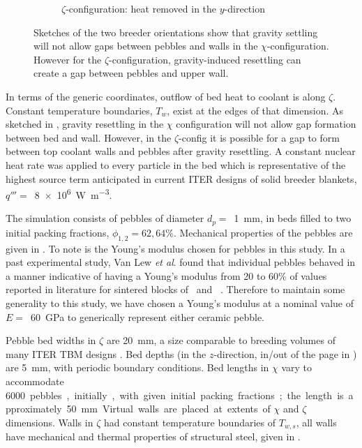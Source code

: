 \begin{figure}[!ht]
\begin{subfigure}[b]{0.44\textwidth}
        \caption{$\zeta$-configuration: heat removed in the $y$-direction}\label{fig:y-domain}
    \end{subfigure}
    \caption{Sketches of the two breeder orientations show that gravity settling will not allow gaps between pebbles and walls in the $\chi$-configuration. However for the $\zeta$-configuration, gravity-induced resettling can create a gap between pebbles and upper wall. }\label{fig:domains}
\end{figure}

In terms of the generic coordinates, outflow of bed heat to coolant is along $\zeta$. Constant temperature boundaries, $T_w$, exist at the edges of that dimension. As sketched in , gravity resettling in the $\chi$ configuration will not allow gap formation between bed and wall. However, in the $\zeta$-config it is possible for a gap to form between top coolant walls and pebbles after gravity resettling. A constant nuclear heat rate was applied to every particle in the bed which is representative of the highest source term anticipated in current ITER designs of solid breeder blankets, $q''' = $~\SI{8e6}{\watt\per\meter\cubed}.

The simulation consists of pebbles of diameter $d_p = $~\SI{1}{\milli\meter}, in beds filled to two initial packing fractions, $\phi_{1,2} = 62, 64\%$. Mechanical properties of the pebbles are given in . To note is the Young's modulus chosen for pebbles in this study. In a past experimental study, Van Lew \textit{et al}. found that individual pebbles behaved in a manner indicative of having a Young's modulus from 20 to 60\% of values reported in literature for sintered blocks of \lit~and \lis~\cite{VanLew2015a}. Therefore to maintain some generality to this study, we have chosen a Young's modulus at a nominal value of $E=$~\SI{60}{\giga\pascal} to generically represent either ceramic pebble.

Pebble bed widths in $\zeta$ are \SI{20}{\milli\meter}, a size comparable to breeding volumes of many ITER TBM designs \cite{Hernandez2013,Cho2008,Feng2012a}. Bed depths (in the $z$-direction, in/out of the page in ) are \SI{5}{\milli\meter}, with periodic boundary conditions. Bed lengths in $\chi$ vary to accommodate \SI{6000} pebbles, initially, with given initial packing fractions; the length is approximately \SI{50}{\milli\meter}. Virtual walls are placed at extents of $\chi$ and $\zeta$ dimensions. Walls in $\zeta$ had constant temperature boundaries of $T_{w,s}$, all walls have mechanical and thermal properties of structural steel, given in .


